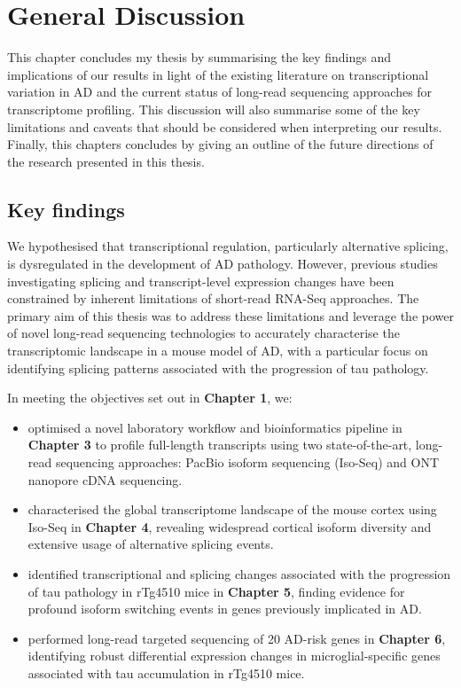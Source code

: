 \chapter{General Discussion}

This chapter concludes my thesis by summarising the key findings and implications of our results in light of the existing literature on transcriptional variation in AD and the current status of long-read sequencing approaches for transcriptome profiling. This discussion will also summarise some of the key limitations and caveats that should be considered when interpreting our results. Finally, this chapters concludes by giving an outline of the future directions of the research presented in this thesis.       

\section{Key findings}
We hypothesised that transcriptional regulation, particularly alternative splicing, is dysregulated in the development of AD pathology. However, previous studies investigating splicing and transcript-level expression changes have been constrained by inherent limitations of short-read RNA-Seq approaches. The primary aim of this thesis was to address these limitations and leverage the power of novel long-read sequencing technologies to accurately characterise the transcriptomic landscape in a mouse model of AD, with a particular focus on identifying splicing patterns associated with the progression of tau pathology.

In meeting the objectives set out in \textbf{Chapter 1}, we:
\begin{itemize}
	\item optimised a novel laboratory workflow and bioinformatics pipeline in \textbf{Chapter 3} to profile full-length transcripts using two state-of-the-art, long-read sequencing approaches: PacBio isoform sequencing (Iso-Seq) and ONT nanopore cDNA sequencing.  
	
	\item characterised the global transcriptome landscape of the mouse cortex using Iso-Seq in \textbf{Chapter 4}, revealing widespread cortical isoform diversity and extensive usage of alternative splicing events. 
	
	\item identified transcriptional and splicing changes associated with the progression of tau pathology in rTg4510 mice in \textbf{Chapter 5}, finding evidence for profound isoform switching events in genes previously implicated in AD. 
	
	\item performed long-read targeted sequencing of 20 AD-risk genes in \textbf{Chapter 6}, identifying robust differential expression changes in microglial-specific genes associated with tau accumulation in rTg4510 mice.    
\end{itemize}

